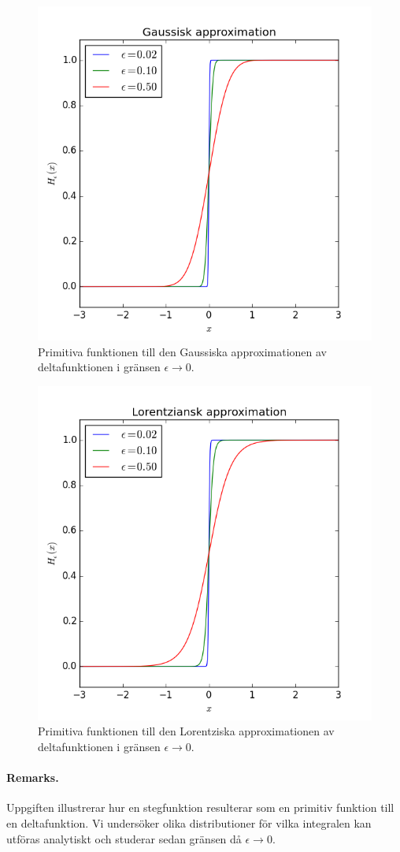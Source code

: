 \documentclass[%
oneside,                 %
final,                   %
10pt]{article}
\newenvironment{doconceexercise}{}{}
\begin{document}
\begin{doconceexercise}
\begin{figure}[!ht]  %
  \centerline{\includegraphics[width=0.6\linewidth]{fig/fig711.png}}
  \caption{
  Primitiva funktionen till den Gaussiska approximationen av deltafunktionen i gränsen $\epsilon \to 0$. \label{fig:711}
  }
\end{figure}



\begin{figure}[!ht]  %
  \centerline{\includegraphics[width=0.6\linewidth]{fig/fig712.png}}
  \caption{
  Primitiva funktionen till den Lorentziska approximationen av deltafunktionen i gränsen $\epsilon \to 0$. \label{fig:712}
  }
\end{figure}




\paragraph{Remarks.}
Uppgiften illustrerar hur en stegfunktion resulterar som en primitiv funktion till en deltafunktion. Vi undersöker olika distributioner för vilka integralen kan utföras analytiskt och studerar sedan gränsen då $\epsilon \to 0$.


\end{doconceexercise}


\end{document}
